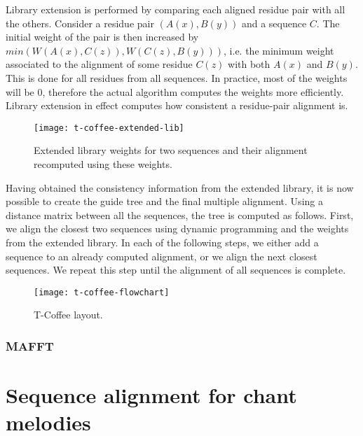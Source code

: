 Library extension is performed by comparing each aligned residue pair with all the others. Consider a residue pair $(A(x), B(y))$ and a sequence $C$.
The initial weight of the pair is then increased by $min(W(A(x), C(z)), W(C(z), B(y)))$, i.e. the minimum weight associated to the alignment of some
residue $C(z)$ with both $A(x)$ and $B(y)$. This is done for all residues from all sequences. In practice, most of the weights will be 0, therefore 
the actual algorithm computes the weights more efficiently. Library extension in effect computes how consistent a residue-pair alignment is.

\begin{figure}[h]
\centering
\texttt{[image: t-coffee-extended-lib]}
\caption{Extended library weights for two sequences and their alignment recomputed using these weights. \citep[Figure~2(c)]{t_coffee}}
\end{figure}

Having obtained the consistency information from the extended library, it is now possible to create the guide tree and the final multiple alignment.
Using a distance matrix between all the sequences, the tree is computed as follows. First, we align the closest two sequences using dynamic programming
and the weights from the extended library. In each of the following steps, we either add a sequence to an already computed alignment, or we align
the next closest sequences. We repeat this step until the alignment of all sequences is complete.

\begin{figure}[h]
\centering
\texttt{[image: t-coffee-flowchart]}
\caption{T-Coffee layout. \citep[Figure~1]{t_coffee}}
\end{figure}

\subsubsection{MAFFT}

\section{Sequence alignment for chant melodies}
